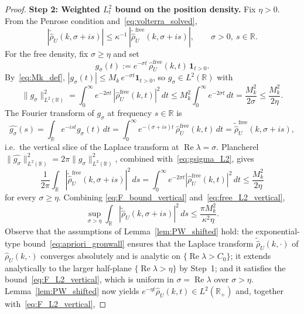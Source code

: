 \documentclass[11pt]{amsart}
\theoremstyle{definition}
\newcommand{\R}{\mathbb{R}}
\begin{document}
\begin{proof}
\medskip

\noindent\textbf{Step 2: Weighted $L^2_t$ bound on the position density.} Fix $\eta>0$. From the Penrose condition and~\eqref{eq:volterra_solved},
\begin{equation}\label{eq:F_bound_vertical}
  |\tilde{\hat\rho}_U(k,\sigma+is)|
  \le \kappa^{-1}\,
  |\tilde{\hat\rho}_U^{\mathrm{free}}
  (k,\sigma+is)|,
  \qquad
  \sigma>0,\ s\in\R.
\end{equation}
For the free density, fix $\sigma\ge\eta$ and set
\[
  g_\sigma(t)
  := e^{-\sigma t}\,
  \hat\rho_U^{\mathrm{free}}(k,t)\,
  \mathbf 1_{t>0}.
\]
By~\eqref{eq:Mk_def}, $|g_\sigma(t)|\le M_k\,e^{-\sigma t} \mathbf 1_{t>0}$, so $g_\sigma\in L^2(\R)$ with
\begin{equation}\label{eq:gsigma_L2}
  \|g_\sigma\|_{L^2(\R)}^2
  = \int_0^\infty e^{-2\sigma t}\,
  |\hat\rho_U^{\mathrm{free}}(k,t)|^2\,dt
  \le M_k^2\int_0^\infty e^{-2\sigma t}\,dt
  = \frac{M_k^2}{2\sigma}
  \le \frac{M_k^2}{2\eta}.
\end{equation}
The Fourier transform of $g_\sigma$ at frequency $s\in\R$ is
\[
  \widehat{g_\sigma}(s)
  = \int_\R e^{-ist}g_\sigma(t)\,dt
  = \int_0^\infty e^{-(\sigma+is)t}\,
  \hat\rho_U^{\mathrm{free}}(k,t)\,dt
  = \tilde{\hat\rho}_U^{\mathrm{free}}
  (k,\sigma+is),
\]
i.e.\ the vertical slice of the Laplace transform at $\operatorname{Re}\lambda=\sigma$. Plancherel $\|\widehat{g_\sigma}\|_{L^2(\R)}^2 =2\pi\|g_\sigma\|_{L^2(\R)}^2$, combined with~\eqref{eq:gsigma_L2}, gives
\begin{equation}\label{eq:free_L2_vertical}
  \frac{1}{2\pi}\int_\R
  |\tilde{\hat\rho}_U^{\mathrm{free}}
  (k,\sigma+is)|^2\,ds
  = \int_0^\infty e^{-2\sigma t}
  |\hat\rho_U^{\mathrm{free}}(k,t)|^2\,dt
  \le \frac{M_k^2}{2\eta}
\end{equation}
for every $\sigma\ge\eta$. Combining \eqref{eq:F_bound_vertical} and~\eqref{eq:free_L2_vertical},
\begin{equation}\label{eq:F_L2_vertical}
  \sup_{\sigma>\eta}
  \int_\R
  |\tilde{\hat\rho}_U(k,\sigma+is)|^2\,ds
  \le \frac{\pi M_k^2}{\kappa^2\eta}.
\end{equation}
Observe that the assumptions of Lemma~\ref{lem:PW_shifted} hold: the exponential-type bound~\eqref{eq:apriori_gronwall} ensures that the Laplace transform $\tilde{\hat\rho}_U(k,\cdot)$ of $\hat\rho_U(k,\cdot)$ converges absolutely and is analytic on $\{\operatorname{Re}\lambda>C_0\}$; it extends analytically to the larger half-plane $\{\operatorname{Re}\lambda>\eta\}$ by Step~1; and it satisfies the bound~\eqref{eq:F_L2_vertical}, which is uniform in $\sigma=\operatorname{Re}\lambda$ over $\sigma>\eta$. Lemma~\ref{lem:PW_shifted} now yields $e^{-\eta t}\hat\rho_U(k,t)\in L^2(\R_+)$ and, together with~\eqref{eq:F_L2_vertical},

\end{proof}
\end{document}
